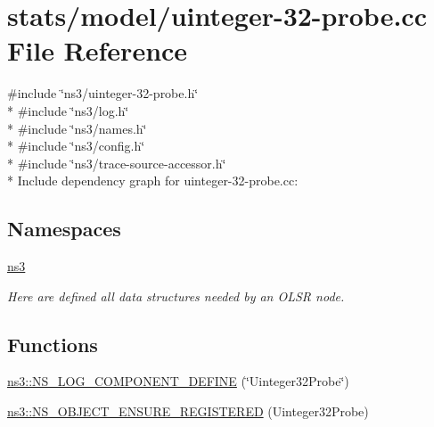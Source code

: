 \hypertarget{uinteger-32-probe_8cc}{}\section{stats/model/uinteger-\/32-\/probe.cc File Reference}
\label{uinteger-32-probe_8cc}
{\ttfamily \#include \char`\"{}ns3/uinteger-\/32-\/probe.\+h\char`\"{}}\\*
{\ttfamily \#include \char`\"{}ns3/log.\+h\char`\"{}}\\*
{\ttfamily \#include \char`\"{}ns3/names.\+h\char`\"{}}\\*
{\ttfamily \#include \char`\"{}ns3/config.\+h\char`\"{}}\\*
{\ttfamily \#include \char`\"{}ns3/trace-\/source-\/accessor.\+h\char`\"{}}\\*
Include dependency graph for uinteger-\/32-\/probe.cc\+:
\subsection*{Namespaces}
\begin{DoxyCompactItemize}
\item 
 \hyperlink{namespacens3}{ns3}
\begin{DoxyCompactList}\small\item\em Here are defined all data structures needed by an O\+L\+SR node. \end{DoxyCompactList}\end{DoxyCompactItemize}
\subsection*{Functions}
\begin{DoxyCompactItemize}
\item 
\hyperlink{namespacens3_ab191796ce31862c85b8696a9faeb21f6}{ns3\+::\+N\+S\+\_\+\+L\+O\+G\+\_\+\+C\+O\+M\+P\+O\+N\+E\+N\+T\+\_\+\+D\+E\+F\+I\+NE} (\char`\"{}Uinteger32\+Probe\char`\"{})
\item 
\hyperlink{namespacens3_a914a8ccb957b5fe21d95b7d3449d62e7}{ns3\+::\+N\+S\+\_\+\+O\+B\+J\+E\+C\+T\+\_\+\+E\+N\+S\+U\+R\+E\+\_\+\+R\+E\+G\+I\+S\+T\+E\+R\+ED} (Uinteger32\+Probe)
\end{DoxyCompactItemize}
